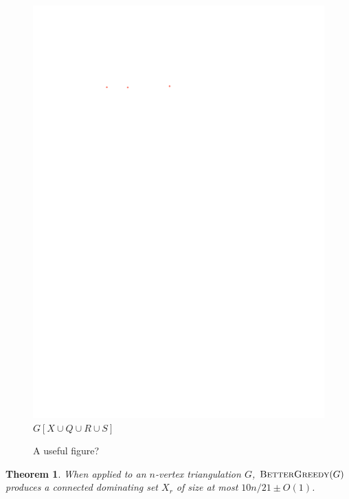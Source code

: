 \documentclass[12pt]{article}
\newtheorem{thm}{Theorem}
\theoremstyle{definition}
\newcommand{\pat}[1]{[\textcolor{red}{PM: #1}]}
\newcommand{\hussein}[1]{[\textcolor{purple}{$H^2$: #1}]}
\begin{document}
\begin{figure}
  \includegraphics[page=4]{figs/bg_layers.pdf} \\
  $G[X\cup Q\cup R\cup S]$ \\[2ex]
  \caption{A useful figure?}
\end{figure}
\begin{thm}\label{best_greedy}
  When applied to an $n$-vertex triangulation $G$,  $\textsc{BetterGreedy}(G)$ produces a connected dominating set $X_r$ of size at most $10n/21\pm O(1)$.
\end{thm}
\end{document}

